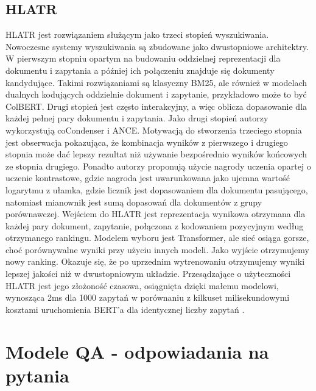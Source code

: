 \subsection{HLATR}


HLATR jest rozwiązaniem służącym jako trzeci stopień wyszukiwania. Nowoczesne systemy
wyszukiwania są zbudowane jako dwustopniowe architektry. W pierwszym stopniu opartym na
budowaniu oddzielnej reprezentacji dla dokumentu i zapytania a później ich połączeniu znajduje się
dokumenty kandydujące. Takimi rozwiązaniami są klasyczny BM25, ale również w modelach dualnych
kodujących oddzielnie dokument i zapytanie, przykładowo może to być ColBERT. Drugi stopień jest
często interakcyjny, a więc oblicza dopasowanie dla każdej pełnej pary dokumentu i zapytania. Jako
drugi stopień autorzy wykorzystują coCondenser i ANCE. Motywacją do stworzenia trzeciego stopnia
jest obserwacja pokazująca, że kombinacja wyników z pierwszego i drugiego stopnia może dać lepszy
rezultat niż używanie bezpośrednio wyników końcowych ze stopnia drugiego. Ponadto autorzy
proponują użycie nagrody uczenia opartej o uczenie kontrastowe, gdzie nagroda jest uwarunkowana
jako ujemna wartość logarytmu z ułamka, gdzie licznik jest dopasowaniem dla dokumentu pasującego,
natomiast mianownik jest sumą dopasowań dla dokumentów z grupy porównawczej. Wejściem do
HLATR jest reprezentacja wynikowa otrzymana dla każdej pary dokument, zapytanie, połączona z
kodowaniem pozycyjnym według otrzymanego rankingu. Modelem wyboru jest Transformer, ale sieć osiąga gorsze, choć porównywalne wyniki przy użyciu innych modeli. Jako wyjście otrzymujemy nowy ranking. Okazuje się,
że po uprzednim wytrenowaniu otrzymujemy wyniki lepszej jakości niż w dwustopniowym układzie.
Przesądzające o użyteczności HLATR jest jego złożoność czasowa, osiągnięta dzięki małemu modelowi,
wynosząca 2ms dla 1000 zapytań w porównaniu z kilkuset milisekundowymi kosztami uruchomienia
BERT'a dla identycznej liczby zapytań \autocite{zhang2022hlatr}.

\section{Modele QA - odpowiadania na pytania}

